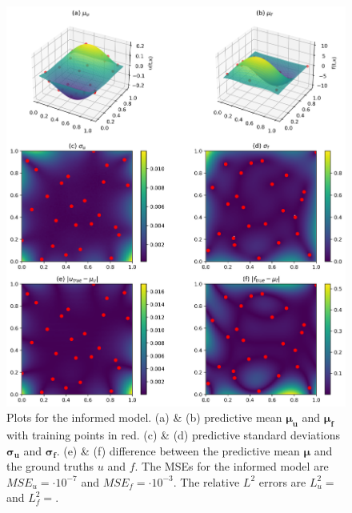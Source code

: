 \documentclass{article}
\begin{document}
\begin{figure}[htbp!]
    \centering
    \includegraphics[width=1\textwidth]{../final_examples/poisson/merged_2d_plots.png}
    \caption{Plots for the informed model. (a) \& (b)  predictive mean $\bm{\mu_u}$ and $\bm{\mu_f}$ with training points in red. (c) \& (d) predictive standard deviations $\bm{\sigma_u}$ and $\bm{\sigma_f}$. (e) \& (f) difference between the predictive mean $\bm{\mu}$ and the ground truths $u$ and $f$. The MSEs for the informed model are $MSE_u =  \cdot 10^{-7}$ and $MSE_f =  \cdot 10^{-3}$. The relative $L^2$ errors are $L^2_u = $ and $L^2_f = $.}
    \label{fig:poisson}
\end{figure}
\end{document}
